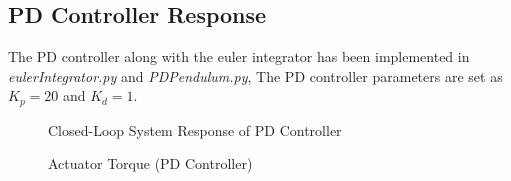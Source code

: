 \subsection{PD Controller Response}
The PD controller along with the euler integrator has been implemented in \emph{eulerIntegrator.py} and \emph{PD\textunderscore Pendulum.py},
The PD controller parameters are set as $K_p = 20$ and $K_d = 1$.
\begin{figure}[h!]
	\centering
	\caption{Closed-Loop System Response of PD Controller}
	\label{fig:resPD_woLimit}
\end{figure}
\begin{figure}[h!]
	\centering
	\caption{Actuator Torque (PD Controller)}
	\label{fig:actPD_woLimit}
\end{figure}

